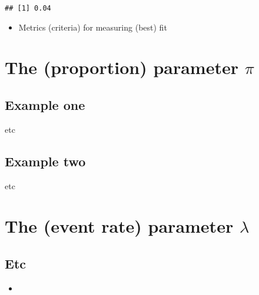 \documentclass[]{book}
\newenvironment{Shaded}{\begin{snugshade}}{\end{snugshade}}
\newcommand{\DecValTok}[1]{\textcolor[rgb]{0.00,0.00,0.81}{#1}}
\newcommand{\KeywordTok}[1]{\textcolor[rgb]{0.13,0.29,0.53}{\textbf{#1}}}
\newcommand{\NormalTok}[1]{#1}
\newcommand{\OperatorTok}[1]{\textcolor[rgb]{0.81,0.36,0.00}{\textbf{#1}}}
\providecommand{\tightlist}{%
  \setlength{\itemsep}{0pt}\setlength{\parskip}{0pt}}
\begin{document}
\begin{Shaded}
\end{Shaded}

\begin{verbatim}
## [1] 0.04
\end{verbatim}

\begin{itemize}
\tightlist
\item
  Metrics (criteria) for measuring (best) fit
\end{itemize}

\hypertarget{paraPi}{%
\chapter{\texorpdfstring{The (proportion) parameter \(\pi\)}{The (proportion) parameter \textbackslash{}pi}}\label{paraPi}}

\hypertarget{example-one}{%
\section{Example one}\label{example-one}}

etc

\hypertarget{example-two}{%
\section{Example two}\label{example-two}}

etc

\hypertarget{paraLambda}{%
\chapter{\texorpdfstring{The (event rate) parameter \(\lambda\)}{The (event rate) parameter \textbackslash{}lambda}}\label{paraLambda}}

\hypertarget{etc}{%
\section{Etc}\label{etc}}

\begin{itemize}
\item
\end{itemize}
\end{document}
